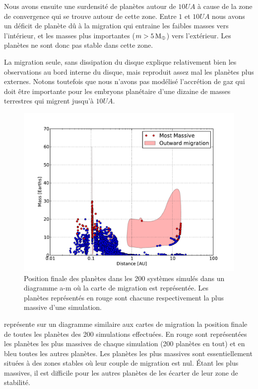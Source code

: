 Nous avons ensuite une surdensité de planètes autour de $10\unit{UA}$ à cause de la zone de convergence qui se trouve autour de cette zone. Entre $1$ et $10\unit{UA}$ nous avons un déficit de planète dû à la migration qui entraine les faibles masses vers l'intérieur, et les masses plus importantes ($m>5\mathrm{\thinspace M_\oplus}$) vers l'extérieur. Les planètes ne sont donc pas stable dans cette zone. 

La migration seule, sans dissipation du disque explique relativement bien les observations au bord interne du disque, mais reproduit assez mal les planètes plus externes. Notons toutefois que nous n'avons pas modélisé l'accrétion de gaz qui doit être importante pour les embryons planétaire d'une dizaine de masses terrestres qui migrent jusqu'à $10\unit{UA}$. 

\begin{figure}[htbp]
\centering
\includegraphics[width=0.8\linewidth]{figure/HSE/m_fct_a.pdf}
\caption{Position finale des planètes dans les 200 systèmes simulés dans un diagramme a-m où la carte de migration est représentée. Les planètes représentés en rouge sont chacune respectivement la plus massive d'une simulation.}\label{fig:HSE_fid_mfcta}
\end{figure}

 représente sur un diagramme similaire aux cartes de migration la position finale de toutes les planètes des 200 simulations effectuées. En rouge sont représentées les planètes les plus massives de chaque simulation (200 planètes en tout) et en bleu toutes les autres planètes. Les planètes les plus massives sont essentiellement situées à des zones stables où leur couple de migration est nul. Étant les plus massives, il est difficile pour les autres planètes de les écarter de leur zone de stabilité. 

